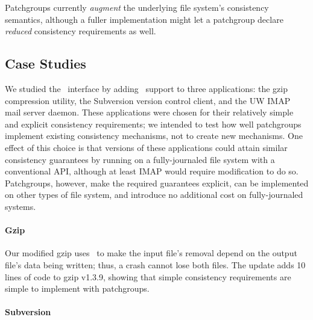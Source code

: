 Patchgroups currently \emph{augment} the underlying file system's
consistency semantics, although a fuller implementation might let a
patchgroup declare \emph{reduced} consistency requirements as well.

\subsection{Case Studies}
\label{sec:patchgroup:casestudies}


We studied the \patchgroup\ interface by adding \patchgroup\ support to three
applications: the gzip compression utility, the Subversion version control
client, and the UW IMAP mail server daemon.
%
These applications were chosen for their relatively simple and explicit
consistency requirements; we intended to test how well patchgroups
implement existing consistency mechanisms, not to create new mechanisms.
One effect of this choice is that versions of
these applications could attain similar consistency guarantees
by running on a
fully-journaled file system with a conventional API, although at least IMAP
would require modification to do so.  Patchgroups, however,
make the required guarantees explicit, can be implemented on other types of
file system, and introduce no additional cost on fully-journaled systems.


\paragraph{Gzip}
\label{sec:patchgroup:gzip}

Our modified gzip uses \patchgroups\ to make the input file's
removal depend on the output file's data being written; thus,
a crash cannot lose both files. The update adds 10 lines of code to gzip
v1.3.9, showing that simple consistency requirements are simple to
implement with patchgroups.

\paragraph{Subversion}
\label{sec:patchgroup:svn}

